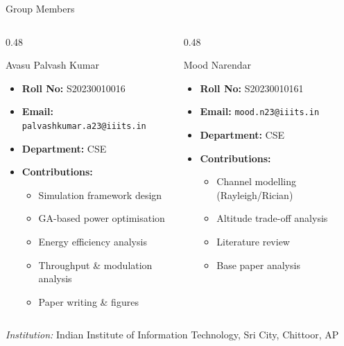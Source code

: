 \documentclass[aspectratio=169, 11pt]{beamer}
\begin{document}
\begin{frame}{Group Members}
\begin{columns}[T]

\begin{column}{0.48\textwidth}
\begin{block}{\centering Avasu Palvash Kumar}
\begin{itemize}
  \item \textbf{Roll No:} S20230010016
  \item \textbf{Email:} \texttt{palvashkumar.a23@iiits.in}
  \item \textbf{Department:} CSE
  \item \textbf{Contributions:}
  \begin{itemize}
    \item Simulation framework design
    \item GA-based power optimisation
    \item Energy efficiency analysis
    \item Throughput \& modulation analysis
    \item Paper writing \& figures
  \end{itemize}
\end{itemize}
\end{block}
\end{column}

\begin{column}{0.48\textwidth}
\begin{block}{\centering Mood Narendar}
\begin{itemize}
  \item \textbf{Roll No:} S20230010161
  \item \textbf{Email:} \texttt{mood.n23@iiits.in}
  \item \textbf{Department:} CSE
  \item \textbf{Contributions:}
  \begin{itemize}
    \item Channel modelling (Rayleigh/Rician)
    \item Altitude trade-off analysis
    \item Literature review
    \item Base paper analysis
  \end{itemize}
\end{itemize}
\end{block}
\end{column}

\end{columns}

\vfill
\centering
\small\textit{Institution:} Indian Institute of Information Technology, Sri City, Chittoor, AP
\end{frame}
\end{document}
